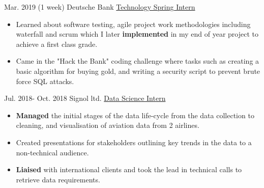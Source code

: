 \documentclass[letterpaper]{twentysecondcv} %
\begin{document}
\begin{twenty}

	\twentyitem
    	{Mar. 2019}
		{(1 week)}
        {Deutsche Bank}
        {\href{http://www.db.com}{Technology Spring Intern}}
        {}
        {
        {\vspace{-1mm} \begin{itemize} 
        \item Learned about software testing, agile project work methodologies including waterfall and scrum which I later \textbf{implemented} in my end of year project to achieve a first class grade. 
        \item Came  in the "Hack the Bank" coding challenge where tasks such as creating a basic algorithm for buying gold, and writing a security script to prevent brute force SQL attacks. \vspace{1mm}
		\end{itemize}}
        }
\end{twenty}

\begin{twenty}
    \twentyitem
        {Jul. 2018-}
        {Oct. 2018}
        {Signol ltd.}
        {\href{http://www.signol.io}{Data Science Intern}}
        {}
        {\vspace{-1mm} \begin{itemize}
            \item \textbf{Managed} the initial stages of the data life-cycle from the data collection to cleaning, and visualisation of aviation data from 2 airlines. 
            \item Created presentations for stakeholders outlining key trends in the data to a non-technical audience. 
            \item \textbf{Liaised} with international clients and took the lead in technical calls to retrieve data requirements.  
        \end{itemize}}
\end{twenty}
\end{document}
